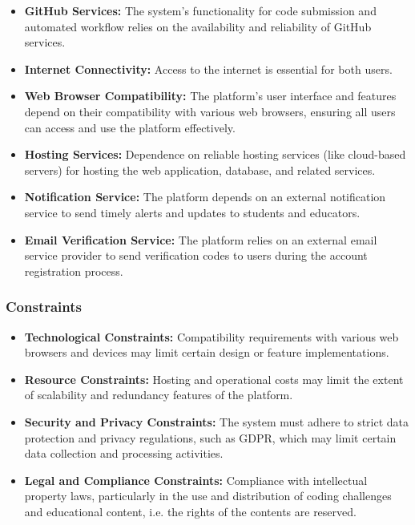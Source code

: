 \begin{itemize}
    \item \textbf{GitHub Services:} The system's functionality for code submission and automated workflow relies on the availability and reliability of GitHub services.

    \item \textbf{Internet Connectivity:} Access to the internet is essential for both users.

    \item \textbf{Web Browser Compatibility:} The platform's user interface and features depend on their compatibility with various web browsers, ensuring all users can access and use the platform effectively.

    \item \textbf{Hosting Services:} Dependence on reliable hosting services (like cloud-based servers) for hosting the web application, database, and related services.

    \item \textbf{Notification Service:} The platform depends on an external notification service to send timely alerts and updates to students and educators.

    \item \textbf{Email Verification Service:} The platform relies on an external email service provider to send verification codes to users during the account registration process.

    
\end{itemize}


\subsubsection{Constraints}

\begin{itemize}
    \item \textbf{Technological Constraints:} Compatibility requirements with various web browsers and devices may limit certain design or feature implementations.

    \item \textbf{Resource Constraints:} Hosting and operational costs may limit the extent of scalability and redundancy features of the platform.

    \item \textbf{Security and Privacy Constraints:} The system must adhere to strict data protection and privacy regulations, such as GDPR, which may limit certain data collection and processing activities.

    \item \textbf{Legal and Compliance Constraints:} Compliance with intellectual property laws, particularly in the use and distribution of coding challenges and educational content, i.e. the rights of the contents are reserved.
\end{itemize}